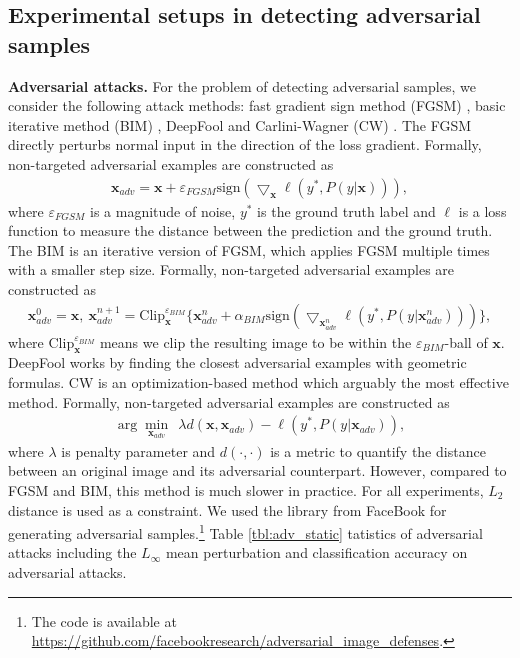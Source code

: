 \documentclass{article}
\begin{document}
\subsection{Experimental setups in detecting adversarial samples} \label{appendix:exp_setup_adver}

{\bf Adversarial attacks.} For the problem of detecting adversarial samples, we consider the following attack methods: fast gradient sign method (FGSM) \citep{goodfellow2014explaining}, basic iterative method (BIM) \citep{kurakin2016adversarial}, DeepFool \citep{moosavi2016deepfool} and Carlini-Wagner (CW) \citep{carlini2017adversarial}. 
The FGSM directly perturbs normal input in the direction of the loss gradient. 
Formally, non-targeted adversarial examples are constructed as
\begin{align*}
    \mathbf{x}_{adv} = \mathbf{x} + \varepsilon_{FGSM} \text{sign} \left(\bigtriangledown_{\mathbf{x}} \ell (y^* , P(y|\mathbf{x})) \right),
\end{align*}
where $\varepsilon_{FGSM}$ is a magnitude of noise, $y^*$ is the ground truth label and $\ell$ is a loss function to measure the distance between the prediction and the ground truth.
The BIM is an iterative version of FGSM, which applies FGSM multiple times with a smaller step size.
Formally, non-targeted adversarial examples are constructed as
\begin{align*}
    \mathbf{x}_{adv}^0 = \mathbf{x}, ~ \mathbf{x}_{adv}^{n+1} = \text{Clip}^{\varepsilon_{BIM}}_{\mathbf{x}} \{ \mathbf{x}_{adv}^{n} + \alpha_{BIM} \text{sign} \left(\bigtriangledown_{\mathbf{x}_{adv}^{n}} \ell (y^* , P(y|{\mathbf{x}_{adv}^{n}})) \right)\},
\end{align*}
where $\text{Clip}_{\mathbf{x}}^{\varepsilon_{BIM}}$ means we clip the resulting image to be within the $\varepsilon_{BIM}$-ball of $\mathbf{x}$.
DeepFool works by finding the closest adversarial examples with geometric formulas. CW is an optimization-based method which arguably the most effective method.
Formally, non-targeted adversarial examples are constructed as
\begin{align*}
    \arg \min_{\mathbf{x}_{adv}} ~~ \lambda d(\mathbf{x},\mathbf{x}_{adv}) - \ell(y^*, P(y|\mathbf{x}_{adv})),
\end{align*}
where $\lambda$ is penalty parameter and $d(\cdot,\cdot)$ is a metric to quantify the distance between an original image and its adversarial counterpart.
However, compared
to FGSM and BIM, this method is much slower in practice.
For all experiments, $L_2$ distance is used as a constraint. We used the library from FaceBook \citep{guo2017countering} for generating adversarial samples.\footnote{The code is available at \url{https://github.com/facebookresearch/adversarial_image_defenses}.} Table \ref{tbl:adv_static} tatistics of adversarial attacks including the $L_{\infty}$ mean perturbation and classification accuracy on adversarial attacks.
\end{document}
